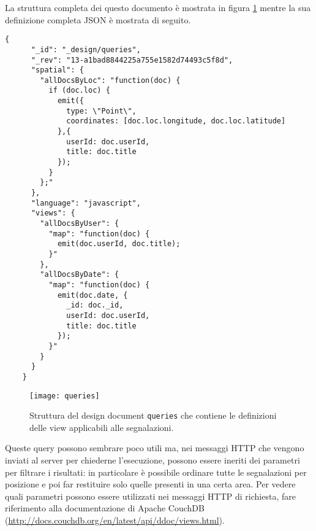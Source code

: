                 La struttura completa dei questo documento è mostrata in
                figura \ref{fig:queries} mentre la sua definizione completa
                JSON è mostrata di seguito.
                \begin{lstlisting}[language=plane]
    {
      "_id": "_design/queries",
      "_rev": "13-a1bad8844225a755e1582d74493c5f8d",
      "spatial": {
        "allDocsByLoc": "function(doc) {
          if (doc.loc) {
            emit({
              type: \"Point\",
              coordinates: [doc.loc.longitude, doc.loc.latitude]
            },{
              userId: doc.userId,
              title: doc.title
            });
          }
        };"
      },
      "language": "javascript",
      "views": {
        "allDocsByUser": {
          "map": "function(doc) {
            emit(doc.userId, doc.title);
          }"
        },
        "allDocsByDate": {
          "map": "function(doc) {
            emit(doc.date, {
              _id: doc._id,
              userId: doc.userId,
              title: doc.title
            });
          }"
        }
      }
    }
                \end{lstlisting}
                \begin{figure}[H]
                    \centering
                    \texttt{[image: queries]}
                    \caption{
                        Struttura del design document \texttt{queries} che
                        contiene le definizioni delle view applicabili alle
                        segnalazioni.
                    }
                    \label{fig:queries}
                \end{figure}
                Queste query possono sembrare poco utili ma, nei messaggi HTTP
                che vengono inviati al server per chiederne l'esecuzione,
                possono essere ineriti dei parametri per filtrare i risultati:
                in particolare è possibile ordinare tutte le segnalazioni per
                posizione e poi far restituire solo quelle presenti in una
                certa area. Per vedere quali parametri possono essere
                utilizzati nei messaggi HTTP di richiesta, fare riferimento
                alla documentazione di Apache CouchDB\texttrademark{}
                (\url{http://docs.couchdb.org/en/latest/api/ddoc/views.html}).

